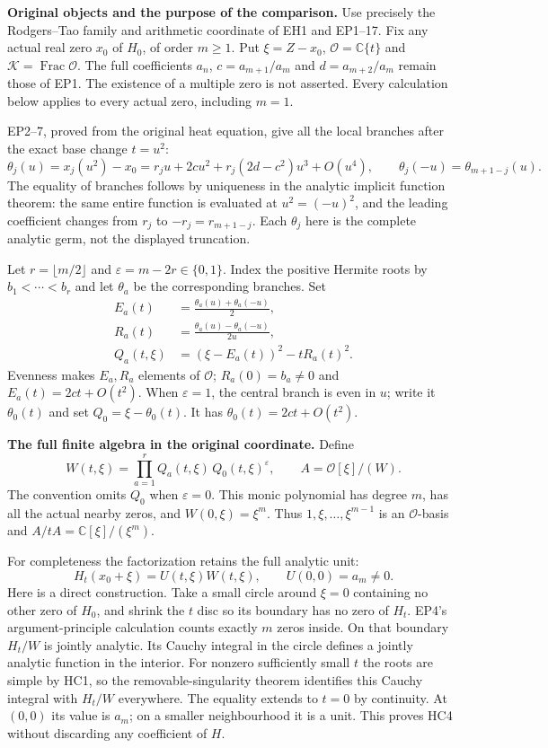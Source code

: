 \documentclass[11pt,a4paper]{article}
\theoremstyle{definition}\newtheorem{definition}[theorem]{Definition}
\begin{document}
\HC\textbf{Original objects and the purpose of the comparison.}
Use precisely the Rodgers--Tao family and arithmetic coordinate of
EH1 and EP1--17. Fix any actual real zero $x_0$ of $H_0$, of order
$m\ge1$. Put $\xi=Z-x_0$, $\mathcal O=\mathbb C\{t\}$ and
$\mathcal K=\operatorname{Frac}\mathcal O$. The full coefficients
$a_n$, $c=a_{m+1}/a_m$ and $d=a_{m+2}/a_m$ remain those of EP1.
The existence of a multiple zero is not asserted. Every calculation
below applies to every actual zero, including $m=1$.

EP2--7, proved from the original heat equation, give all the local
branches after the exact base change $t=u^2$:
\[
 \theta_j(u)=x_j(u^2)-x_0
   =r_j u+2cu^2+r_j(2d-c^2)u^3+O(u^4),\qquad
 \theta_j(-u)=\theta_{m+1-j}(u).
 \tag{HC1}
\]
The equality of branches follows by uniqueness in the analytic
implicit function theorem: the same entire function is evaluated
at $u^2=(-u)^2$, and the leading coefficient changes from $r_j$
to $-r_j=r_{m+1-j}$. Each $\theta_j$ here is the complete analytic
germ, not the displayed truncation.

Let $r=\lfloor m/2\rfloor$ and $\varepsilon=m-2r\in\{0,1\}$.
Index the positive Hermite roots by $b_1<\cdots<b_r$ and let
$\theta_a$ be the corresponding branches. Set
\[
 \begin{split}
 E_a(t)&=\frac{\theta_a(u)+\theta_a(-u)}2,\\
 R_a(t)&=\frac{\theta_a(u)-\theta_a(-u)}{2u},\\
 Q_a(t,\xi)&=(\xi-E_a(t))^2-tR_a(t)^2.
 \end{split}
 \tag{HC2}
\]
Evenness makes $E_a,R_a$ elements of $\mathcal O$;
$R_a(0)=b_a\ne0$ and $E_a(t)=2ct+O(t^2)$.
When $\varepsilon=1$, the central branch is even in $u$;
write it $\theta_0(t)$ and set $Q_0=\xi-\theta_0(t)$.
It has $\theta_0(t)=2ct+O(t^2)$.

\HC\textbf{The full finite algebra in the original coordinate.}
Define
\[
 W(t,\xi)=\prod_{a=1}^r Q_a(t,\xi)\,Q_0(t,\xi)^{\varepsilon},
 \qquad A=\mathcal O[\xi]/(W).
 \tag{HC3}
\]
The convention omits $Q_0$ when $\varepsilon=0$. This monic
polynomial has degree $m$, has all the actual nearby zeros, and
$W(0,\xi)=\xi^m$. Thus $1,\xi,\ldots,\xi^{m-1}$ is an
$\mathcal O$-basis and $A/tA=\mathbb C[\xi]/(\xi^m)$.

For completeness the factorization retains the full analytic unit:
\[
 H_t(x_0+\xi)=U(t,\xi)W(t,\xi),\qquad U(0,0)=a_m\ne0.
 \tag{HC4}
\]
Here is a direct construction. Take a small circle around $\xi=0$
containing no other zero of $H_0$, and shrink the $t$ disc so its
boundary has no zero of $H_t$. EP4's argument-principle calculation
counts exactly $m$ zeros inside. On that boundary $H_t/W$ is
jointly analytic. Its Cauchy integral in the circle defines a
jointly analytic function in the interior. For nonzero sufficiently
small $t$ the roots are simple by HC1, so the removable-singularity
theorem identifies this Cauchy integral with $H_t/W$ everywhere.
The equality extends to $t=0$ by continuity. At $(0,0)$ its value
is $a_m$; on a smaller neighbourhood it is a unit. This proves HC4
without discarding any coefficient of $H$.
\end{document}
